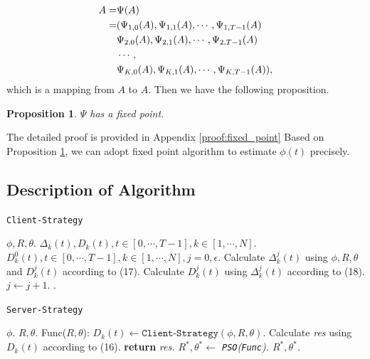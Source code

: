 \documentclass{article}
\theoremstyle{plain}
\newtheorem{proposition}[theorem]{Proposition}
\theoremstyle{definition}
\theoremstyle{remark}
\begin{document}
\begin{align}
  A = & \Psi(A) \notag \\
    = & (\Psi_{1, 0}(A), \Psi_{1, 1}(A), \cdots, \Psi_{1, T-1}(A) \notag \\
      & \Psi_{2, 0}(A), \Psi_{2, 1}(A), \cdots, \Psi_{2, T-1}(A) \notag \\
      & \cdots, \notag \\
      & \Psi_{K, 0}(A), \Psi_{K, 1}(A), \cdots, \Psi_{K, T-1}(A)),
\end{align}
which is a mapping from $A$ to $A$.
Then we have the following proposition.
\begin{proposition}
  \label{proposition:fixed point}
  $\Psi$ has a fixed point.
\end{proposition}
The detailed proof is provided in Appendix \ref{proof:fixed_point}
Based on Proposition \ref{proposition:fixed point}, we can adopt fixed point algorithm to estimate $\phi(t)$ precisely.

\subsection{Description of Algorithm}

 \begin{algorithm}[tb]
    \caption{\texttt{Client-Strategy}}
    \begin{algorithmic}[1]
         $\phi, R, \theta$.
         $\Delta_k(t), D_k(t), t \in [0, \cdots, T -1], k \in [1, \cdots, N]$.
         $D_k^0(t), t \in [0, \cdots, T - 1], k \in [1, \cdots, N], j=0, \epsilon$.
        \REPEAT
                    \STATE Calculate $\Delta_k^j(t)$ using $\phi, R, \theta$ and $D_k^j(t)$ according to (17).
                    \STATE Calculate $D_k^j(t)$ using $\Delta_k^j(t)$ according to (18).
                \ENDFOR
            \ENDFOR
            \STATE $j \gets j + 1.$
        .
    \end{algorithmic}
 \end{algorithm}

 \begin{algorithm}[tb]
    \caption{\texttt{Server-Strategy}}
    \begin{algorithmic}[1]
         $\phi$.
         $R, \theta$.
         Func($R, \theta$):
        \STATE \hspace{1em} $D_k(t) \gets \texttt{Client-Strategy}(\phi, R, \theta)$.
        \STATE \hspace{1em} Calculate {\it res} using $D_k(t)$ according to (16).
        \STATE \hspace{1em} {\bfseries return} \it{res}.
        \STATE $R^*, \theta^* \gets$ \texttt{PSO}(\texttt{Func}).
         $R^*, \theta^*$.
    \end{algorithmic}
\end{algorithm}
\end{document}

